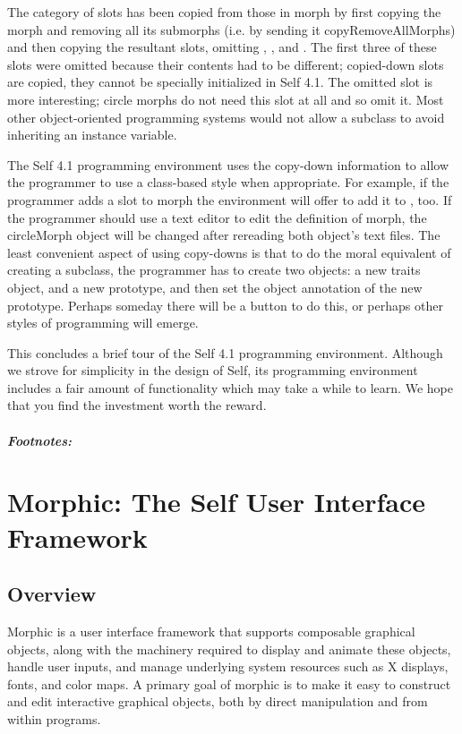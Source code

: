 \documentclass[letterpaper,10pt,english]{sphinxmanual}
\begin{document}
The  category of slots has been copied from those in morph by first copying
the morph and removing all its submorphs (i.e. by sending it copyRemoveAllMorphs) and then
copying the resultant slots, omitting , ,  and . The first
three of these slots were omitted because their contents had to be different; copied-down slots are
copied, they cannot be specially initialized in Self 4.1. The omitted slot  is more interesting;
circle morphs do not need this slot at all and so omit it. Most other object-oriented programming
systems would not allow a subclass to avoid inheriting an instance variable.

The Self 4.1 programming environment uses the copy-down information to allow the programmer
to use a class-based style when appropriate. For example, if the programmer adds a slot to morph
the environment will offer to add it to , too. If the programmer should use a text editor
to edit the definition of morph, the circleMorph object will be changed after rereading both object’s
text files. The least convenient aspect of using copy-downs is that to do the moral equivalent
of creating a subclass, the programmer has to create two objects: a new traits object, and a new prototype,
and then set the object annotation of the new prototype. Perhaps someday there will be a
button to do this, or perhaps other styles of programming will emerge.

This concludes a brief tour of the Self 4.1 programming environment. Although we strove for simplicity
in the design of Self, its programming environment includes a fair amount of functionality
which may take a while to learn. We hope that you find the investment worth the reward.
\paragraph{Footnotes:}


\chapter{Morphic: The Self User Interface Framework}
\label{morphic::doc}\label{morphic:morphic-the-self-user-interface-framework}

\section{Overview}
\label{morphic:overview}
Morphic is a user interface framework that supports composable graphical objects, along with the machinery required to display and animate these objects, handle user inputs, and manage underlying system resources such as X displays, fonts, and color maps. A primary goal of morphic is to make it easy to construct and edit interactive graphical objects, both by direct manipulation and from within programs.
\end{document}
